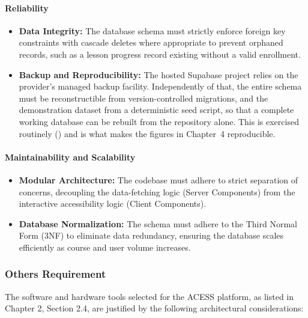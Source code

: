 \documentclass[12pt, oneside]{article} %
\newcommand{\tcode}[1]{\path{#1}}
\begin{document}
\paragraph{Reliability}
\begin{itemize}
    \item \textbf{Data Integrity:} The database schema must strictly enforce foreign key constraints with cascade deletes where appropriate to prevent orphaned records, such as a lesson progress record existing without a valid enrollment.
    \item \textbf{Backup and Reproducibility:} The hosted Supabase project relies on the provider's managed backup facility. Independently of that, the entire schema must be reconstructible from version-controlled migrations, and the demonstration dataset from a deterministic seed script, so that a complete working database can be rebuilt from the repository alone. This is exercised routinely (\tcode{npm run db:rebuild}) and is what makes the figures in Chapter~4 reproducible.
\end{itemize}

\paragraph{Maintainability and Scalability}
\begin{itemize}
    \item \textbf{Modular Architecture:} The codebase must adhere to strict separation of concerns, decoupling the data-fetching logic (Server Components) from the interactive accessibility logic (Client Components).
    \item \textbf{Database Normalization:} The schema must adhere to the Third Normal Form (3NF) to eliminate data redundancy, ensuring the database scales efficiently as course and user volume increases.
\end{itemize}

\subsubsection{Others Requirement}

The software and hardware tools selected for the ACESS platform, as listed in Chapter 2, Section 2.4, are justified by the following architectural considerations:
\end{document}
